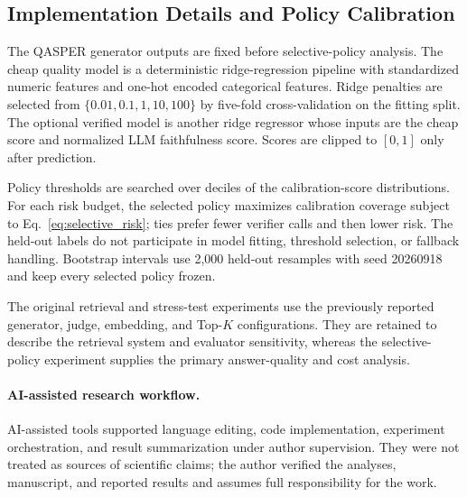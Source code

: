 \documentclass[smallextended]{svjour3}
\begin{document}
\subsection{Implementation Details and Policy Calibration}
\label{subsec:implementation}
The QASPER generator outputs are fixed before selective-policy analysis. The cheap quality model is a deterministic ridge-regression pipeline with standardized numeric features and one-hot encoded categorical features. Ridge penalties are selected from $\{0.01,0.1,1,10,100\}$ by five-fold cross-validation on the fitting split. The optional verified model is another ridge regressor whose inputs are the cheap score and normalized LLM faithfulness score. Scores are clipped to $[0,1]$ only after prediction.

Policy thresholds are searched over deciles of the calibration-score distributions. For each risk budget, the selected policy maximizes calibration coverage subject to Eq.~\ref{eq:selective_risk}; ties prefer fewer verifier calls and then lower risk. The held-out labels do not participate in model fitting, threshold selection, or fallback handling. Bootstrap intervals use 2,000 held-out resamples with seed 20260918 and keep every selected policy frozen.

The original retrieval and stress-test experiments use the previously reported generator, judge, embedding, and Top-$K$ configurations. They are retained to describe the retrieval system and evaluator sensitivity, whereas the selective-policy experiment supplies the primary answer-quality and cost analysis.

\paragraph{AI-assisted research workflow.} AI-assisted tools supported language editing, code implementation, experiment orchestration, and result summarization under author supervision. They were not treated as sources of scientific claims; the author verified the analyses, manuscript, and reported results and assumes full responsibility for the work.
\end{document}
